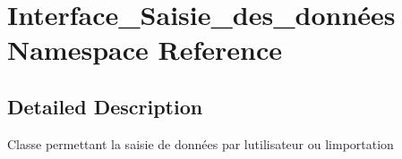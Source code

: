 \hypertarget{namespace_interface___saisie__des__donn_xC3_xA9es}{}\section{Interface\+\_\+\+Saisie\+\_\+des\+\_\+données Namespace Reference}
\label{namespace_interface___saisie__des__donn_xC3_xA9es}


\subsection{Detailed Description}
Classe permettant la saisie de données par l\textquotesingle{}utilisateur ou l\textquotesingle{}importation 